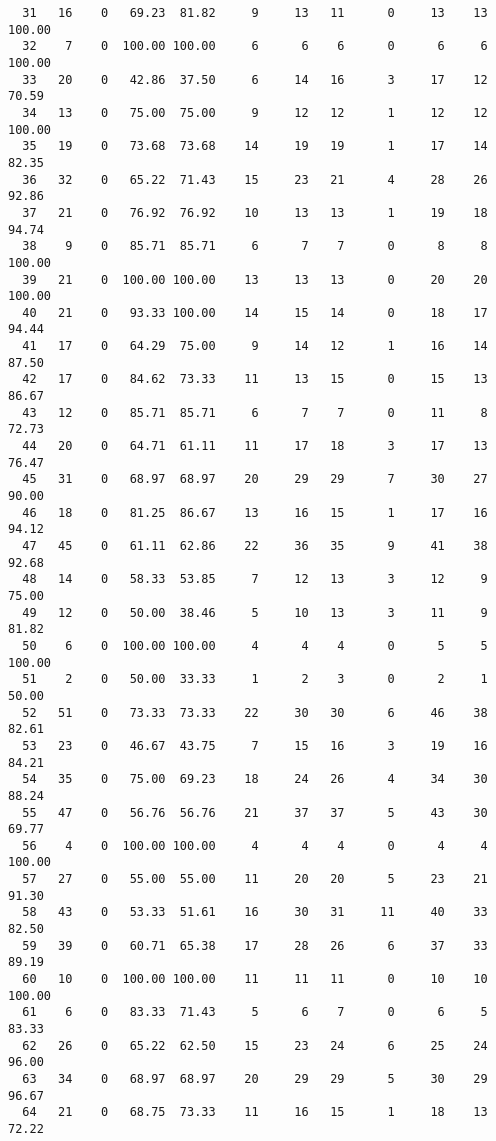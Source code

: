 \begin{verbatim}
  31   16    0   69.23  81.82     9     13   11      0     13    13   100.00
  32    7    0  100.00 100.00     6      6    6      0      6     6   100.00
  33   20    0   42.86  37.50     6     14   16      3     17    12    70.59
  34   13    0   75.00  75.00     9     12   12      1     12    12   100.00
  35   19    0   73.68  73.68    14     19   19      1     17    14    82.35
  36   32    0   65.22  71.43    15     23   21      4     28    26    92.86
  37   21    0   76.92  76.92    10     13   13      1     19    18    94.74
  38    9    0   85.71  85.71     6      7    7      0      8     8   100.00
  39   21    0  100.00 100.00    13     13   13      0     20    20   100.00
  40   21    0   93.33 100.00    14     15   14      0     18    17    94.44
  41   17    0   64.29  75.00     9     14   12      1     16    14    87.50
  42   17    0   84.62  73.33    11     13   15      0     15    13    86.67
  43   12    0   85.71  85.71     6      7    7      0     11     8    72.73
  44   20    0   64.71  61.11    11     17   18      3     17    13    76.47
  45   31    0   68.97  68.97    20     29   29      7     30    27    90.00
  46   18    0   81.25  86.67    13     16   15      1     17    16    94.12
  47   45    0   61.11  62.86    22     36   35      9     41    38    92.68
  48   14    0   58.33  53.85     7     12   13      3     12     9    75.00
  49   12    0   50.00  38.46     5     10   13      3     11     9    81.82
  50    6    0  100.00 100.00     4      4    4      0      5     5   100.00
  51    2    0   50.00  33.33     1      2    3      0      2     1    50.00
  52   51    0   73.33  73.33    22     30   30      6     46    38    82.61
  53   23    0   46.67  43.75     7     15   16      3     19    16    84.21
  54   35    0   75.00  69.23    18     24   26      4     34    30    88.24
  55   47    0   56.76  56.76    21     37   37      5     43    30    69.77
  56    4    0  100.00 100.00     4      4    4      0      4     4   100.00
  57   27    0   55.00  55.00    11     20   20      5     23    21    91.30
  58   43    0   53.33  51.61    16     30   31     11     40    33    82.50
  59   39    0   60.71  65.38    17     28   26      6     37    33    89.19
  60   10    0  100.00 100.00    11     11   11      0     10    10   100.00
  61    6    0   83.33  71.43     5      6    7      0      6     5    83.33
  62   26    0   65.22  62.50    15     23   24      6     25    24    96.00
  63   34    0   68.97  68.97    20     29   29      5     30    29    96.67
  64   21    0   68.75  73.33    11     16   15      1     18    13    72.22

\end{verbatim}
